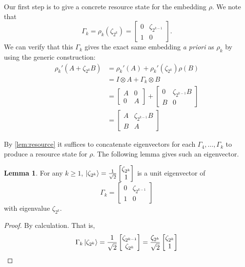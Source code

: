 \documentclass{article}
\theoremstyle{definition}
\theoremstyle{theorem}
\newtheorem{lemma}{Lemma}
\theoremstyle{remark}
\begin{document}
Our first step is to give a concrete resource state for the embedding $\rho$. We note that
\[
	\Gamma_k = \rho_k(\zeta_{2^k}) = \begin{bmatrix} 0 & \zeta_{2^{k-1}} \\ 1 & 0 \end{bmatrix}.
\]
We can verify that this $\Gamma_k$ gives the exact same embedding \textit{a priori} as $\rho_k$ by using the generic construction:
\begin{align*}
	\rho_k'(A + \zeta_{2^k}B)
		&=\rho_k'(A) + \rho_k'(\zeta_{2^k})\rho(B) \\
		&=I \otimes A + \Gamma_k \otimes B \\
		&=\begin{bmatrix} A & 0 \\ 0 & A \end{bmatrix} + \begin{bmatrix} 0 & \zeta_{2^{k-1}}B \\ B & 0 \end{bmatrix} \\
		&= \begin{bmatrix} A & \zeta_{2^{k-1}}B \\ B & A \end{bmatrix}
\end{align*}

By \cref{lem:resource} it suffices to concatenate eigenvectors for each $\Gamma_4, \dots, \Gamma_k$ to produce a resource state for $\rho$. The following lemma gives such an eigenvector.

\begin{lemma}
For any $k\geq 1$, $\ket{\zeta_{2^k}} = \frac{1}{\sqrt{2}}\begin{bmatrix} \zeta_{2^k} \\ 1 \end{bmatrix}$ is a unit eigenvector of
\[
	\Gamma_k = \begin{bmatrix} 0 & \zeta_{2^{k-1}} \\ 1 & 0 \end{bmatrix}
\]
with eigenvalue $\zeta_{2^k}$.
\end{lemma}
\begin{proof}
By calculation. That is,
\[
	\Gamma_k \ket{\zeta_{2^k}} = \frac{1}{\sqrt{2}}\begin{bmatrix} \zeta_{2^{k-1}} \\ \zeta_{2^k} \end{bmatrix} 
		= \frac{\zeta_{2^k}}{\sqrt{2}} \begin{bmatrix} \zeta_{2^k} \\ 1 \end{bmatrix}
\]
\end{proof}
\end{document}

